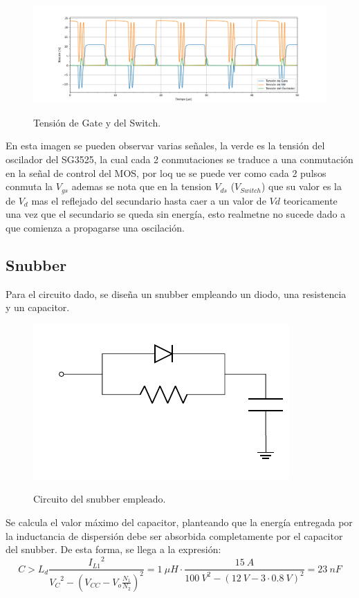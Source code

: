 \begin{figure}[H]
	\centering
	\includegraphics[width=\linewidth]{ImagenesParteII/TensionesVarias1.png}
	\label{fig:tensionesvarias}
	\caption{Tensión de Gate y del Switch.}
\end{figure}
En esta imagen se pueden observar varias señales, la verde es la tensión del oscilador del SG3525, la cual cada 2 conmutaciones se traduce a una conmutación en la señal de control del MOS, por loq ue se puede ver como cada 2 pulsos conmuta la $V_{gs}$ ademas se nota que en la tension $V_{ds}$ ($V_{Switch}$)  que su valor es la de $V_d$ mas el reflejado del secundario hasta caer a un valor de $Vd$ teoricamente una vez que el secundario se queda sin energía, esto realmetne no sucede dado a que comienza a propagarse una oscilación.
\subsection{Snubber}
Para el circuito dado, se diseña un snubber empleando un diodo, una resistencia y un capacitor.
\begin{figure}[H]
	\centering
	\includegraphics[width=0.3\linewidth, page = 1]{ImagenesParteII/Snubber.pdf}
	\label{fig:snubber}
	\caption{Circuito del snubber empleado.}
\end{figure}

Se calcula el valor máximo del capacitor, planteando que la energía entregada por la inductancia de dispersión debe ser absorbida completamente por el capacitor del snubber. De esta forma, se llega a la expresión:
\begin{equation}
	C > L_d  \frac{{I_{L1}}^2}{{V_{C}}^2 - \left( V_{CC} - V_{o} \frac{N_1}{N_2} \right)^2 } = 1 \ \mu H \cdot \frac{15 \ A}{{100 \ V}^2 - \left( 12 \ V - 3 \cdot 0.8 \ V \right)^2} = 23 \ nF
\end{equation}

